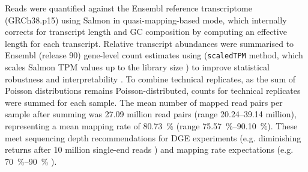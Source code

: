 Reads were quantified against the Ensembl reference transcriptome (GRCh38.p15) using Salmon \autocite{patro2017SalmonProvidesFast} in quasi-mapping-based mode, 
which internally corrects for transcript length and GC composition by computing an effective length for each transcript.
%
Relative transcript abundances were summarised to Ensembl (release 90) gene-level count estimates using  (\texttt{scaledTPM} method, which scales Salmon \gls{TPM} values up to the library size \autocite{soneson2016DifferentialAnalysesRNAseq,love2018SwimmingDownstreamStatistical}) to improve statistical robustness and interpretability \autocite{soneson2016DifferentialAnalysesRNAseq}.
To combine technical replicates, as the sum of Poisson distributions remains Poisson-distributed, counts for technical replicates were summed for each sample.
The mean number of mapped read pairs per sample after summing was 27.09 million read pairs (range \numrange{20.24}{39.14} million), representing a mean mapping rate of \SI{80.73}{\percent} (range \SIrange{75.57}{90.10}{\percent}).
These meet sequencing depth recommendations for \gls{DGE} experiments
(e.g. diminishing returns after 10 million single-end reads \autocite{liu2014RNAseqDifferentialExpression}) 
and mapping rate expectations 
(e.g. \SIrange{70}{90}{\percent} \autocite{conesa2016SurveyBestPractices}).
%
%
